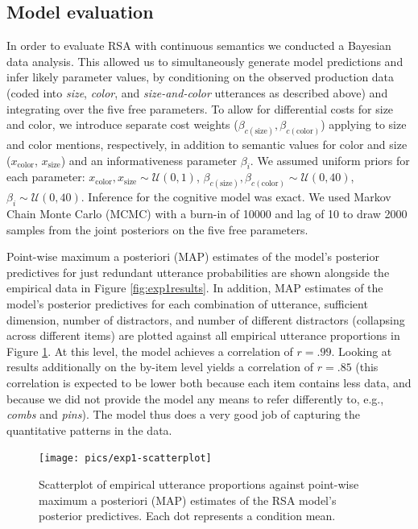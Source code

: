 \documentclass[11pt]{article}
\newcommand{\figref}[1]{Figure \ref{#1}}
\begin{document}
\subsection{Model evaluation}
\label{sec:modifiermodeleval}

In order to evaluate RSA with continuous semantics we conducted a Bayesian data analysis.  This allowed us to  simultaneously generate model predictions and infer likely parameter values, by conditioning on the observed production data (coded into \emph{size}, \emph{color}, and \emph{size-and-color} utterances as described above) and integrating over the five free parameters. To allow for differential costs for size and color, we introduce separate cost weights ($\beta_{c(\textrm{size})}, \beta_{c(\textrm{color})}$) applying to size and color mentions, respectively, in addition to semantic values for color and size ($x_{\textrm{color}}$, $x_{\textrm{size}}$) and an informativeness parameter $\beta_i$. We assumed uniform priors for each parameter: $x_{\textrm{color}}, x_{\textrm{size}} \sim \mathcal{U}(0,1)$,  $\beta_{c(\textrm{size})}, \beta_{c(\textrm{color})} \sim \mathcal{U}(0,40)$, $\beta_i  \sim \mathcal{U}(0,40)$.
Inference for the cognitive model was exact. We used Markov Chain Monte Carlo (MCMC) with a burn-in of 10000 and lag of 10 to draw 2000 samples from the joint posteriors on the five free parameters.

Point-wise maximum a posteriori (MAP) estimates of the model's posterior predictives for just redundant utterance probabilities are shown alongside the empirical data in \figref{fig:exp1results}. In addition, MAP estimates of the model's posterior predictives for each combination of utterance, sufficient dimension, number of distractors, and number of different distractors (collapsing across different items) are plotted against all empirical utterance proportions in \figref{fig:exp1predictives}. At this level, the model achieves a correlation of $r = .99$. Looking at results additionally on the by-item level yields a correlation of $r = .85$ (this correlation is expected to be lower both because each item contains less data, and because we did not provide the model any means to refer differently to, e.g., \emph{combs} and \emph{pins}). The model thus does a very good job of capturing the quantitative patterns in the data. 

\begin{figure}
\centering
\texttt{[image: pics/exp1-scatterplot]}
\caption{Scatterplot of empirical utterance proportions against point-wise maximum a posteriori (MAP) estimates of the RSA model's posterior predictives. Each dot represents a condition mean.}
\label{fig:exp1predictives}
\end{figure}
\end{document}
